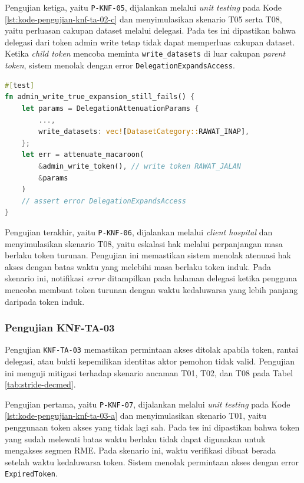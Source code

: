 \documentclass[bahasa, 12pt, a4paper, onecolumn, oneside, final]{report}
\begin{document}
Pengujian ketiga, yaitu \texttt{P-KNF-05}, dijalankan melalui \textit{unit testing} pada Kode \ref{lst:kode-pengujian-knf-ta-02-c} dan menyimulasikan skenario T05 serta T08, yaitu perluasan cakupan dataset melalui delegasi. Pada tes ini dipastikan bahwa delegasi dari token admin write tetap tidak dapat memperluas cakupan dataset. Ketika \textit{child token} mencoba meminta \texttt{write\_datasets} di luar cakupan \textit{parent token}, sistem menolak dengan error \texttt{DelegationExpandsAccess}.

\begin{lstlisting}[language=Rust, caption=Pengujian P-KNF-05 untuk KNF-TA-02, label=lst:kode-pengujian-knf-ta-02-c]
#[test]
fn admin_write_true_expansion_still_fails() {
    let params = DelegationAttenuationParams {
        ...,
        write_datasets: vec![DatasetCategory::RAWAT_INAP],
    };
    let err = attenuate_macaroon(
		&admin_write_token(), // write token RAWAT_JALAN
		&params
	)
	// assert error DelegationExpandsAccess
}
\end{lstlisting}

Pengujian terakhir, yaitu \texttt{P-KNF-06}, dijalankan melalui \textit{client hospital} dan menyimulasikan skenario T08, yaitu eskalasi hak melalui perpanjangan masa berlaku token turunan. Pengujian ini memastikan sistem menolak atenuasi hak akses dengan batas waktu yang melebihi masa berlaku token induk. Pada skenario ini, notifikasi \textit{error} ditampilkan pada halaman delegasi ketika pengguna mencoba membuat token turunan dengan waktu kedaluwarsa yang lebih panjang daripada token induk.

\subsubsection{Pengujian KNF-TA-03}
\label{subsubsec:pengujian-knf-ta-03}

Pengujian \texttt{KNF-TA-03} memastikan permintaan akses ditolak apabila token, rantai delegasi, atau bukti kepemilikan identitas aktor pemohon tidak valid. Pengujian ini menguji mitigasi terhadap skenario ancaman T01, T02, dan T08 pada Tabel \ref{tab:stride-decmed}.

Pengujian pertama, yaitu \texttt{P-KNF-07}, dijalankan melalui \textit{unit testing} pada Kode \ref{lst:kode-pengujian-knf-ta-03-a} dan menyimulasikan skenario T01, yaitu penggunaan token akses yang tidak lagi sah. Pada tes ini dipastikan bahwa token yang sudah melewati batas waktu berlaku tidak dapat digunakan untuk mengakses segmen RME. Pada skenario ini, waktu verifikasi dibuat berada setelah waktu kedaluwarsa token. Sistem menolak permintaan akses dengan error \texttt{ExpiredToken}.
\end{document}
